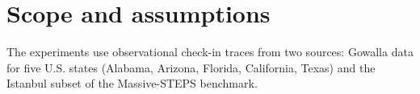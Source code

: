 \section{Scope and assumptions}
\label{sec:intro:scope}

The experiments use observational check-in traces from two sources: Gowalla data for
five U.S. states (Alabama, Arizona, Florida, California, Texas) and the Istanbul subset of the Massive-STEPS
benchmark. %
